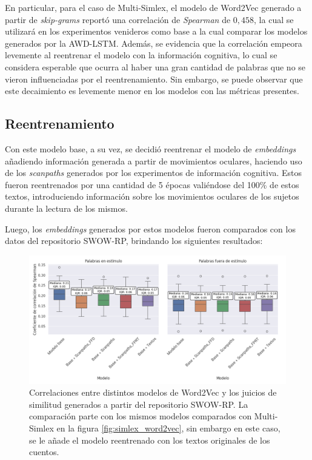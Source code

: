 En particular, para el caso de Multi-Simlex, el modelo de Word2Vec generado a partir de \textit{skip-grams} 
reportó una correlación de \textit{Spearman} de $0,458$, la cual se utilizará en los experimentos venideros 
como base a la cual comparar los modelos generados por la AWD-LSTM. Además, se evidencia que 
la correlación empeora levemente al reentrenar el modelo con la información cognitiva, lo 
cual se considera esperable que ocurra al haber una gran cantidad de palabras que no se 
vieron influenciadas por el reentrenamiento. Sin embargo, se puede observar que este 
decaimiento es levemente menor en los modelos con las métricas presentes.

\subsection{Reentrenamiento}

Con este modelo base, a su vez, se decidió reentrenar el modelo de \textit{embeddings} 
añadiendo información generada a partir de movimientos oculares, haciendo uso 
de los \textit{scanpaths} generados por los experimentos de información cognitiva. Estos 
fueron reentrenados por una cantidad de 5 épocas valiéndose del 100\% de estos 
textos, introduciendo información sobre los movimientos oculares de los sujetos 
durante la lectura de los mismos.

Luego, los \textit{embeddings} generados por estos modelos fueron comparados con los datos 
del repositorio SWOW-RP, brindando los siguientes resultados:

\begin{figure}[H]
    \centering
    \includegraphics[width=1\textwidth]{imagenes/swow_word2vec.png}
    \caption{Correlaciones entre distintos modelos de Word2Vec y los juicios de similitud 
    generados a partir del repositorio SWOW-RP. La comparación parte con los mismos modelos 
    comparados con Multi-Simlex en la figura \ref{fig:simlex_word2vec}, sin embargo en este caso, se le añade el 
    modelo reentrenado con los textos originales de los cuentos.}
    \label{fig:swow_word2vec}
\end{figure}

